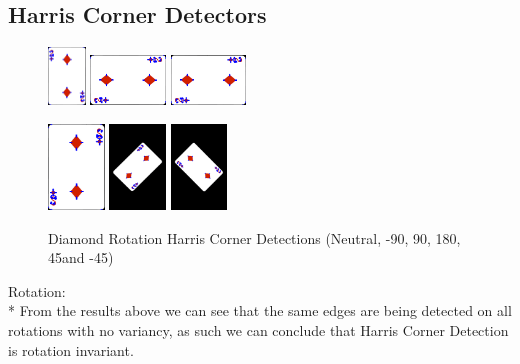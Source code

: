 \documentclass[conference]{IEEEtran}
\begin{document}
\subsection{Harris Corner Detectors}
\begin{figure}[htbp]
    \centerline{
        {\includegraphics[width=10mm, scale=0.5]{./figures/Harris Corner/diamondNeutral Corners.png}}
        {\includegraphics[width=20mm, scale=0.5]{./figures/Harris Corner/diamondDeg 90 Corners.png}}
        {\includegraphics[width=20mm, scale=0.5]{./figures/Harris Corner/diamondDeg -90 Corners.png}}
    }
    \centerline{
        {\includegraphics[width=15mm, scale=0.5]{./figures/Harris Corner/diamond180 Deg Corners.png}}
        {\includegraphics[width=15mm, scale=0.5]{./figures/Harris Corner/diamondDeg -45 Corners.png}}
        {\includegraphics[width=15mm, scale=0.5]{./figures/Harris Corner/diamondDeg 45 Corners.png}}
    }
    \caption{Diamond Rotation Harris Corner Detections (Neutral, -90\degree, 90\degree, 180\degree, 45\degree and -45\degree)}
    \label{fig}
\end{figure}
Rotation: \\*
From the results above we can see that the same edges are being detected on all rotations with no variancy, as such we can conclude that Harris Corner Detection is rotation invariant.
\end{document}
